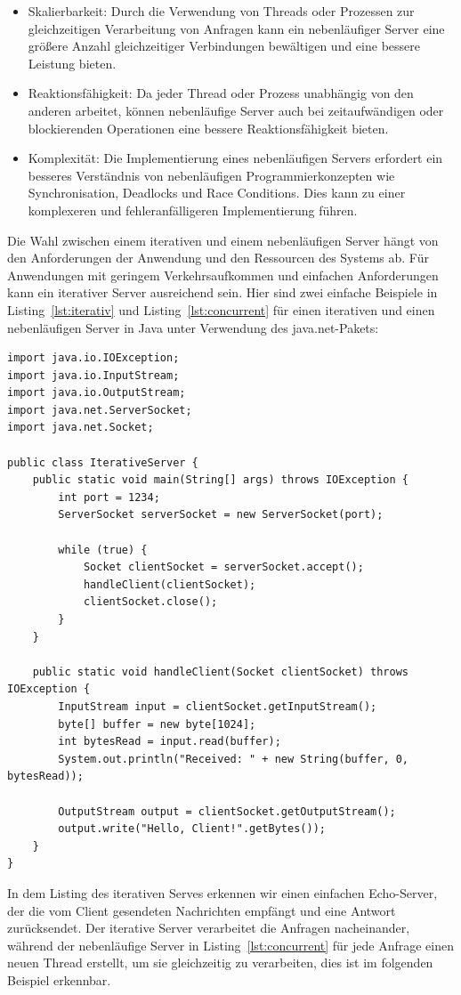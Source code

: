 \documentclass[../vs-script-first-v01.tex]{subfiles}
\begin{document}
\begin{itemize}
\item Skalierbarkeit: Durch die Verwendung von Threads oder Prozessen zur gleichzeitigen Verarbeitung von Anfragen kann ein nebenläufiger Server eine größere Anzahl gleichzeitiger Verbindungen bewältigen und eine bessere Leistung bieten.
\item Reaktionsfähigkeit: Da jeder Thread oder Prozess unabhängig von den anderen arbeitet, können nebenläufige Server auch bei zeitaufwändigen oder blockierenden Operationen eine bessere Reaktionsfähigkeit bieten.
\item Komplexität: Die Implementierung eines nebenläufigen Servers erfordert ein besseres Verständnis von nebenläufigen Programmierkonzepten wie Synchronisation, Deadlocks und Race Conditions. Dies kann zu einer komplexeren und fehleranfälligeren Implementierung führen.
\end{itemize}
Die Wahl zwischen einem iterativen und einem nebenläufigen Server hängt von den Anforderungen der Anwendung und den Ressourcen des Systems ab. Für Anwendungen mit geringem Verkehrsaufkommen und einfachen Anforderungen kann ein iterativer Server ausreichend sein. Hier sind zwei einfache Beispiele in Listing~\ref{lst:iterativ} und Listing~\ref{lst:concurrent} für einen iterativen und einen nebenläufigen Server in Java unter Verwendung des java.net-Pakets:
\begin{lstlisting}[caption={Iterativer Server},captionpos=b,label={lst:iterativ}]
import java.io.IOException;
import java.io.InputStream;
import java.io.OutputStream;
import java.net.ServerSocket;
import java.net.Socket;

public class IterativeServer {
    public static void main(String[] args) throws IOException {
        int port = 1234;
        ServerSocket serverSocket = new ServerSocket(port);

        while (true) {
            Socket clientSocket = serverSocket.accept();
            handleClient(clientSocket);
            clientSocket.close();
        }
    }

    public static void handleClient(Socket clientSocket) throws IOException {
        InputStream input = clientSocket.getInputStream();
        byte[] buffer = new byte[1024];
        int bytesRead = input.read(buffer);
        System.out.println("Received: " + new String(buffer, 0, bytesRead));

        OutputStream output = clientSocket.getOutputStream();
        output.write("Hello, Client!".getBytes());
    }
}
\end{lstlisting}
In dem Listing des iterativen Serves erkennen wir einen einfachen Echo-Server, der die vom Client gesendeten Nachrichten empfängt und eine Antwort zurücksendet. Der iterative Server verarbeitet die Anfragen nacheinander, während der nebenläufige Server in Listing~\ref{lst:concurrent} für jede Anfrage einen neuen Thread erstellt, um sie gleichzeitig zu verarbeiten, dies ist im folgenden Beispiel erkennbar.
\end{document}
